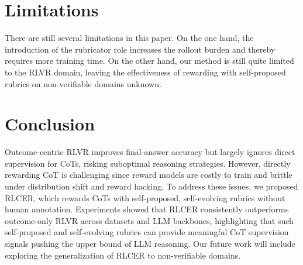 \section{Limitations}
There are still several limitations in this paper.
On the one hand, the introduction of the rubricator role increases the rollout burden and thereby requires more training time.
On the other hand, our method is still quite limited to the RLVR domain, leaving the effectiveness of rewarding with self-proposed rubrics on non-verifiable domains unknown.

\section{Conclusion}
Outcome-centric RLVR improves final-answer accuracy but largely ignores direct supervision for CoTs, risking suboptimal reasoning strategies. 
However, directly rewarding CoT is challenging since reward models are costly to train and brittle under distribution shift and reward hacking. 
To address these issues, we proposed RLCER, which rewards CoTs with self-proposed, self-evolving rubrics without human annotation. 
Experiments showed that RLCER consistently outperforms outcome-only RLVR across datasets and LLM backbones, highlighting that such self-proposed and self-evolving rubrics can provide meaningful CoT supervision signals pushing the upper bound of LLM reasoning. 
Our future work will include exploring the generalization of RLCER to non-verifiable domains. 